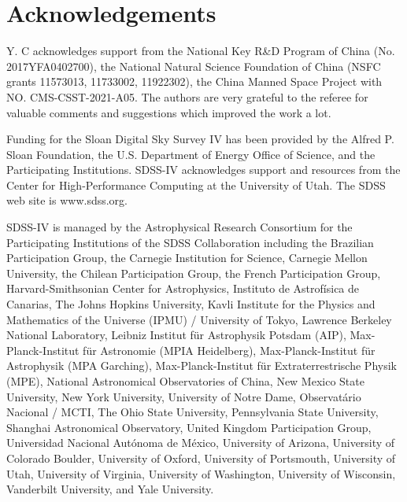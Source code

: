 \section*{Acknowledgements}

Y. C acknowledges support from the National Key R\&D Program of China (No. 2017YFA0402700), the National Natural Science Foundation of China (NSFC grants 11573013, 11733002, 11922302), the China Manned Space Project with NO. CMS-CSST-2021-A05. The authors are very grateful to the referee for valuable comments and suggestions which improved the work a lot.

Funding for the Sloan Digital Sky Survey IV has been provided by the Alfred P.
Sloan Foundation, the U.S. Department of Energy Office of Science, and the Participating Institutions.
SDSS-IV acknowledges support and resources from the Center for High-Performance Computing at
the University of Utah. The SDSS web site is www.sdss.org.

SDSS-IV is managed by the Astrophysical Research Consortium for the Participating Institutions of the SDSS Collaboration 
including the Brazilian Participation Group, the Carnegie Institution for Science, Carnegie Mellon University, the Chilean Participation 
Group, the French Participation Group, Harvard-Smithsonian Center for Astrophysics, Instituto de Astrof\'isica de Canarias, The Johns 
Hopkins University, Kavli Institute for the Physics and Mathematics of the Universe (IPMU) / University of Tokyo, Lawrence Berkeley 
National Laboratory, Leibniz Institut f\"ur Astrophysik Potsdam (AIP), Max-Planck-Institut f\"ur Astronomie (MPIA Heidelberg), 
Max-Planck-Institut f\"ur Astrophysik (MPA Garching), Max-Planck-Institut f\"ur Extraterrestrische Physik (MPE), National 
Astronomical Observatories of China, New Mexico State University, New York University, University of Notre Dame, 
Observat\'ario Nacional / MCTI, The Ohio State University, Pennsylvania State University, Shanghai Astronomical Observatory, 
United Kingdom Participation Group, Universidad Nacional Aut\'onoma de M\'exico, University of Arizona, University of Colorado Boulder, 
University of Oxford, University of Portsmouth, University of Utah, University of Virginia, University of Washington, University of Wisconsin, 
Vanderbilt University, and Yale University.
